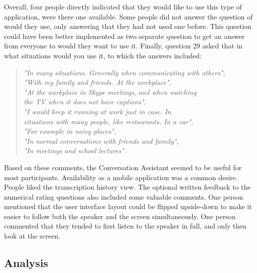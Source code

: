\documentclass[english, 12pt, a4paper, pdftex, elec, utf8]{aaltothesis}
\renewcommand{\baselinestretch}{1.02}
\begin{document}
Overall, four people directly indicated that they would like to use this type of application, were there one available. Some people did not answer the question of would they use, only answering that they had not used one before. This question could have been better implemented as two separate question to get an answer from everyone to would they want to use it. Finally, question 29 asked that in what situations would you use it, to which the answers included:
\begin{quote}
    \centering
    \renewcommand{\baselinestretch}{1.4}
    \textit{
        "In many situations. Generally when communicating with others", \\
        "With my family and friends. At the workplace", \\
        "At the workplace in Skype meetings, and when watching \\ \vspace{-2.5mm} the TV when it does not have captions", \\
        "I would keep it running at work just in case. In  \\ \vspace{-2.5mm} situations with many people, like restaurants. In a car", \\
        "For example in noisy places", \\
        "In normal conversations with friends and family", \\
        \vspace{2mm}
        "In meetings and school lectures".} \\
\end{quote}
Based on these comments, the Conversation Assistant seemed to be useful for most participants. Availability as a mobile application was a common desire. People liked the transcription history view. The optional written feedback to the numerical rating questions also included some valuable comments. One person mentioned that the user interface layout could be flipped upside-down to make it easier to follow both the speaker and the screen simultaneously. One person commented that they tended to first listen to the speaker in full, and only then look at the screen.

\subsection{Analysis} \label{sec:analysis}
\end{document}
